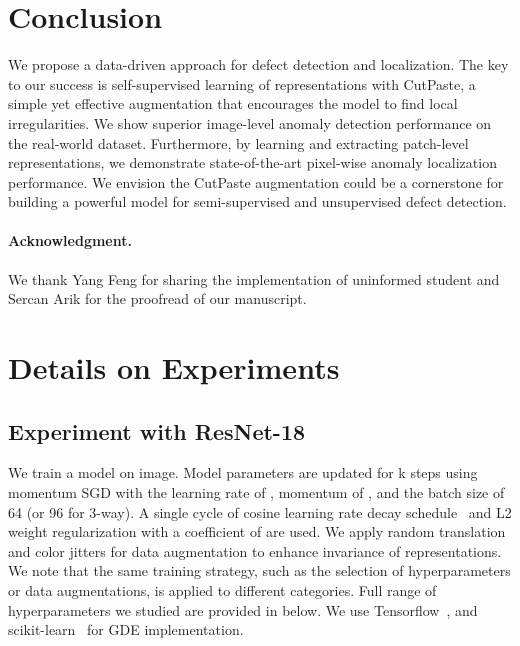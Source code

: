 \documentclass[final]{cvpr}
\begin{document}
\section{Conclusion}
\label{sec:concl}
We propose a data-driven approach for defect detection and localization. The key to our success is self-supervised learning of representations with CutPaste, a simple yet effective augmentation that encourages the model to find local irregularities. We show superior image-level anomaly detection performance on the real-world dataset. Furthermore, by learning and extracting patch-level representations, we demonstrate state-of-the-art pixel-wise anomaly localization performance. We envision the CutPaste augmentation could be a cornerstone for building a powerful model for semi-supervised and unsupervised defect detection.


\paragraph{Acknowledgment.}
We thank Yang Feng for sharing the implementation of uninformed student and Sercan Arik for the proofread of our manuscript.

\newpage
{\small


}

\newpage
\appendix

\onecolumn

\section{Details on Experiments}
\label{sec:app_detail_exp}

\subsection{Experiment with ResNet-18}
\label{sec:exp_setting_resnet}
We train a model on  image. Model parameters are updated for k steps using momentum SGD with the learning rate of , momentum of , and the batch size of 64 (or 96 for 3-way). A single cycle of cosine learning rate decay schedule~\cite{loshchilov2016sgdr} and L2 weight regularization with a coefficient of  are used. We apply random translation and color jitters for data augmentation to enhance invariance of representations. We note that the same training strategy, such as the selection of hyperparameters or data augmentations, is applied to different categories. Full range of hyperparameters we studied are provided in below. We use Tensorflow~\cite{abadi2016tensorflow}, and scikit-learn~\cite{scikit-learn} for GDE implementation.
\end{document}
